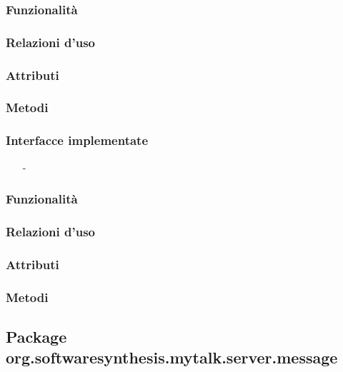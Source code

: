 \subsubsection*{Funzionalità}

\subsubsection*{Relazioni d'uso}

\subsubsection*{Attributi}

\subsubsection*{Metodi}


\subsubsection*{Interfacce implementate}
\begin{itemize}[noitemsep,nolistsep]
  \item[-] 
\end{itemize}

\subsubsection*{Funzionalità}

\subsubsection*{Relazioni d'uso}

\subsubsection*{Attributi}

\subsubsection*{Metodi}

\subsection{Package org.softwaresynthesis.mytalk.server.message}\label{sec:message}

